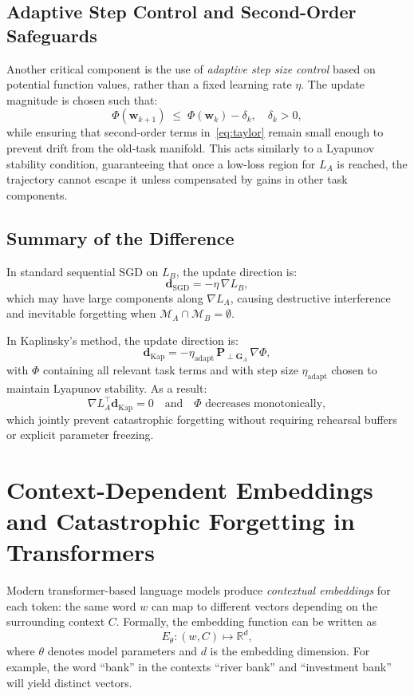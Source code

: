 \documentclass[12pt]{article}
\begin{document}
\subsection{Adaptive Step Control and Second-Order Safeguards}
Another critical component is the use of \emph{adaptive step size control} based on
potential function values, rather than a fixed learning rate $\eta$. The update
magnitude is chosen such that:
\begin{equation}
\Phi(\mathbf{w}_{k+1}) \;\leq\; \Phi(\mathbf{w}_k) - \delta_k, 
\quad \delta_k>0,
\end{equation}
while ensuring that second-order terms in~\eqref{eq:taylor} remain small enough to
prevent drift from the old-task manifold. This acts similarly to a Lyapunov stability
condition, guaranteeing that once a low-loss region for $L_A$ is reached, the
trajectory cannot escape it unless compensated by gains in other task components.

\subsection{Summary of the Difference}
In standard sequential SGD on $L_B$, the update direction is:
\[
\mathbf{d}_{\text{SGD}} = -\eta\, \nabla L_B,
\]
which may have large components along $\nabla L_A$, causing destructive interference
and inevitable forgetting when $\mathcal{M}_A \cap \mathcal{M}_B = \emptyset$.

In Kaplinsky's method, the update direction is:
\[
\mathbf{d}_{\text{Kap}} = -\eta_{\text{adapt}}\, \mathbf{P}_{\perp \mathbf{G}_A} \, 
\nabla \Phi,
\]
with $\Phi$ containing all relevant task terms and with step size $\eta_{\text{adapt}}$
chosen to maintain Lyapunov stability.  
As a result:
\[
\nabla L_A^\top \mathbf{d}_{\text{Kap}} = 0
\quad\text{and}\quad
\Phi \text{ decreases monotonically},
\]
which jointly prevent catastrophic forgetting without requiring rehearsal buffers or
explicit parameter freezing.

\section{Context-Dependent Embeddings and Catastrophic Forgetting in Transformers}

Modern transformer-based language models produce \emph{contextual embeddings} for each token: 
the same word $w$ can map to different vectors depending on the surrounding context $C$. 
Formally, the embedding function can be written as
\[
E_\theta: (w, C) \mapsto \mathbb{R}^d,
\]
where $\theta$ denotes model parameters and $d$ is the embedding dimension. 
For example, the word ``bank'' in the contexts ``river bank'' and ``investment bank'' 
will yield distinct vectors.
\end{document}
